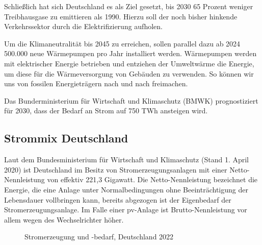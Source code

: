 \documentclass[12pt, a4paper]{article}
\begin{document}
Schließlich hat sich Deutschland es als Ziel gesetzt, bis 2030 65 Prozent weniger Treibhausgase zu emittieren als  1990. Hierzu soll der noch bisher hinkende Verkehrssektor durch die Elektrifizierung aufholen.

Um die Klimaneutralität bis 2045 zu erreichen, sollen parallel dazu ab 2024 500.000 neue Wärmepumpen pro Jahr installiert werden. Wärmepumpen werden mit elektrischer Energie betrieben und entziehen der Umweltwärme die Energie, um diese für die Wärmeversorgung von Gebäuden zu verwenden. So können wir uns von fossilen Energieträgern nach und nach freimachen.

Das Bunderministerium für Wirtschaft und Klimaschutz (BMWK) prognostiziert für 2030, dass der Bedarf an Strom auf 750 TWh ansteigen wird.

\subsection{Strommix Deutschland}

Laut dem Bundesministerium für Wirtschaft und Klimaschutz (Stand 1. April 2020) ist Deutschland im Besitz von Stromerzeugungsanlagen mit einer Netto-Nennleistung von effektiv 221,3 Gigawatt. Die Netto-Nennleistung bezeichnet die Energie, die eine Anlage unter Normalbedingungen ohne Beeinträchtigung der Lebensdauer vollbringen kann, bereits abgezogen ist der Eigenbedarf der Stromerzeugungsanlage. Im Falle einer \ac{pv}-Anlage ist Brutto-Nennleistung vor allem wegen des Wechselrichter höher. 

\begin{figure}
\centering
\def\svgwidth{450pt}
\fontsize{7}{10}\selectfont

\caption{Stromerzeugung und -bedarf, Deutschland 2022}
\label{fig:stromerzeugung_de_2022}
\end {figure}
\end{document}
